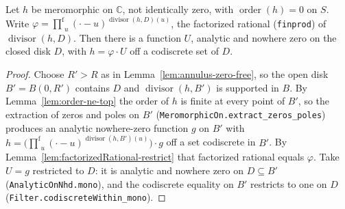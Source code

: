 \begin{lemma}[Existence of the factorization $h = \varphi\cdot U$]
    \label{lem:factorization-existence}
    \leanok
    Let $h$ be meromorphic on $\mathbb{C}$, not identically zero, with
    $\operatorname{order}(h) = 0$ on $S$. Write
    $\varphi = \operatorname*{{\textstyle\prod}^{\mathrm f}}_{u}
      (\cdot-u)^{\operatorname{divisor}(h,D)(u)}$, the factorized rational
    (\texttt{finprod}) of $\operatorname{divisor}(h,D)$. Then there is a function
    $U$, analytic and nowhere zero on the closed disk $D$, with
    $h = \varphi\cdot U$ off a codiscrete set of $D$.
\end{lemma}
\begin{proof}
    Choose $R' > R$ as in Lemma~\ref{lem:annulus-zero-free}, so the open disk
    $B' = B(0,R')$ contains $D$ and $\operatorname{divisor}(h, B')$ is supported
    in $B$. By Lemma~\ref{lem:order-ne-top} the order of $h$ is finite at every
    point of $B'$, so the extraction of zeros and poles on $B'$
    (\texttt{MeromorphicOn.extract\_zeros\_poles}) produces an analytic
    nowhere-zero function $g$ on $B'$ with
    $h = \big(\operatorname*{{\textstyle\prod}^{\mathrm f}}_{u}
    (\cdot-u)^{\operatorname{divisor}(h,B')(u)}\big)\cdot g$ off a set codiscrete
    in $B'$. By Lemma~\ref{lem:factorizedRational-restrict} that factorized
    rational equals $\varphi$. Take $U = g$ restricted to $D$: it is analytic and
    nowhere zero on $D \subseteq B'$ (\texttt{AnalyticOnNhd.mono}), and the
    codiscrete equality on $B'$ restricts to one on $D$
    (\texttt{Filter.codiscreteWithin\_mono}).
\end{proof}

